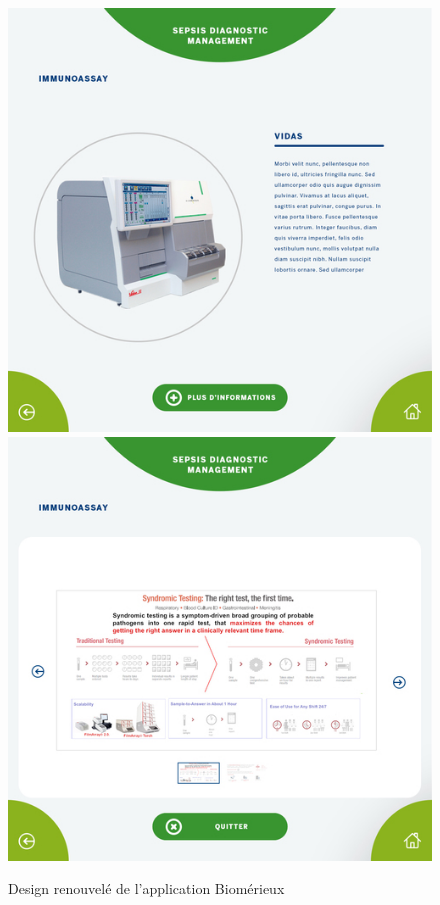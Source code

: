 \documentclass{article}
\begin{document}
\begin{figure}[h]
    \includegraphics[scale=0.195]{resized-bmx-3-new.jpg}
    \includegraphics[scale=0.195]{resized-bmx-4-new.jpg}
    \caption{Design renouvelé de l'application Biomérieux}
\end{figure}
\end{document}
